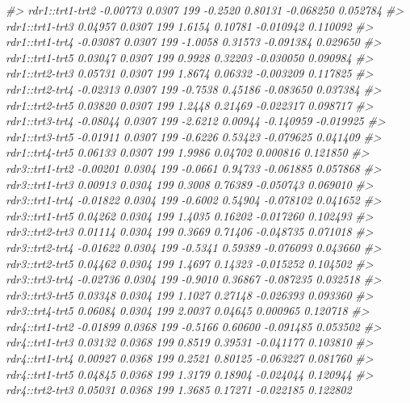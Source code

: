 \documentclass[
]{book}
\newenvironment{Shaded}{\begin{snugshade}}{\end{snugshade}}
\newcommand{\CommentTok}[1]{\textcolor[rgb]{0.56,0.35,0.01}{\textit{#1}}}
\begin{document}
\begin{Shaded}
\begin{Highlighting}[]
\CommentTok{\#\textgreater{} rdr1::trt1{-}trt2 {-}0.00773 0.0307 199 {-}0.2520 0.80131 {-}0.068250  0.052784}
\CommentTok{\#\textgreater{} rdr1::trt1{-}trt3  0.04957 0.0307 199  1.6154 0.10781 {-}0.010942  0.110092}
\CommentTok{\#\textgreater{} rdr1::trt1{-}trt4 {-}0.03087 0.0307 199 {-}1.0058 0.31573 {-}0.091384  0.029650}
\CommentTok{\#\textgreater{} rdr1::trt1{-}trt5  0.03047 0.0307 199  0.9928 0.32203 {-}0.030050  0.090984}
\CommentTok{\#\textgreater{} rdr1::trt2{-}trt3  0.05731 0.0307 199  1.8674 0.06332 {-}0.003209  0.117825}
\CommentTok{\#\textgreater{} rdr1::trt2{-}trt4 {-}0.02313 0.0307 199 {-}0.7538 0.45186 {-}0.083650  0.037384}
\CommentTok{\#\textgreater{} rdr1::trt2{-}trt5  0.03820 0.0307 199  1.2448 0.21469 {-}0.022317  0.098717}
\CommentTok{\#\textgreater{} rdr1::trt3{-}trt4 {-}0.08044 0.0307 199 {-}2.6212 0.00944 {-}0.140959 {-}0.019925}
\CommentTok{\#\textgreater{} rdr1::trt3{-}trt5 {-}0.01911 0.0307 199 {-}0.6226 0.53423 {-}0.079625  0.041409}
\CommentTok{\#\textgreater{} rdr1::trt4{-}trt5  0.06133 0.0307 199  1.9986 0.04702  0.000816  0.121850}
\CommentTok{\#\textgreater{} rdr3::trt1{-}trt2 {-}0.00201 0.0304 199 {-}0.0661 0.94733 {-}0.061885  0.057868}
\CommentTok{\#\textgreater{} rdr3::trt1{-}trt3  0.00913 0.0304 199  0.3008 0.76389 {-}0.050743  0.069010}
\CommentTok{\#\textgreater{} rdr3::trt1{-}trt4 {-}0.01822 0.0304 199 {-}0.6002 0.54904 {-}0.078102  0.041652}
\CommentTok{\#\textgreater{} rdr3::trt1{-}trt5  0.04262 0.0304 199  1.4035 0.16202 {-}0.017260  0.102493}
\CommentTok{\#\textgreater{} rdr3::trt2{-}trt3  0.01114 0.0304 199  0.3669 0.71406 {-}0.048735  0.071018}
\CommentTok{\#\textgreater{} rdr3::trt2{-}trt4 {-}0.01622 0.0304 199 {-}0.5341 0.59389 {-}0.076093  0.043660}
\CommentTok{\#\textgreater{} rdr3::trt2{-}trt5  0.04462 0.0304 199  1.4697 0.14323 {-}0.015252  0.104502}
\CommentTok{\#\textgreater{} rdr3::trt3{-}trt4 {-}0.02736 0.0304 199 {-}0.9010 0.36867 {-}0.087235  0.032518}
\CommentTok{\#\textgreater{} rdr3::trt3{-}trt5  0.03348 0.0304 199  1.1027 0.27148 {-}0.026393  0.093360}
\CommentTok{\#\textgreater{} rdr3::trt4{-}trt5  0.06084 0.0304 199  2.0037 0.04645  0.000965  0.120718}
\CommentTok{\#\textgreater{} rdr4::trt1{-}trt2 {-}0.01899 0.0368 199 {-}0.5166 0.60600 {-}0.091485  0.053502}
\CommentTok{\#\textgreater{} rdr4::trt1{-}trt3  0.03132 0.0368 199  0.8519 0.39531 {-}0.041177  0.103810}
\CommentTok{\#\textgreater{} rdr4::trt1{-}trt4  0.00927 0.0368 199  0.2521 0.80125 {-}0.063227  0.081760}
\CommentTok{\#\textgreater{} rdr4::trt1{-}trt5  0.04845 0.0368 199  1.3179 0.18904 {-}0.024044  0.120944}
\CommentTok{\#\textgreater{} rdr4::trt2{-}trt3  0.05031 0.0368 199  1.3685 0.17271 {-}0.022185  0.122802}

\end{Highlighting}
\end{Shaded}
\end{document}
